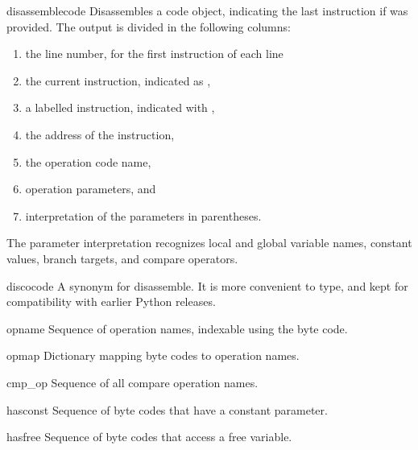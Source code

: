 \begin{funcdesc}{disassemble}{code}
Disassembles a code object, indicating the last instruction if 
was provided.  The output is divided in the following columns:

\begin{enumerate}
\item the line number, for the first instruction of each line
\item the current instruction, indicated as \samp{-->},
\item a labelled instruction, indicated with \samp{>>},
\item the address of the instruction,
\item the operation code name,
\item operation parameters, and
\item interpretation of the parameters in parentheses.
\end{enumerate}

The parameter interpretation recognizes local and global
variable names, constant values, branch targets, and compare
operators.
\end{funcdesc}

\begin{funcdesc}{disco}{code}
A synonym for disassemble.  It is more convenient to type, and kept
for compatibility with earlier Python releases.
\end{funcdesc}

\begin{datadesc}{opname}
Sequence of operation names, indexable using the byte code.
\end{datadesc}

\begin{datadesc}{opmap}
Dictionary mapping byte codes to operation names.
\end{datadesc}

\begin{datadesc}{cmp_op}
Sequence of all compare operation names.
\end{datadesc}

\begin{datadesc}{hasconst}
Sequence of byte codes that have a constant parameter.
\end{datadesc}

\begin{datadesc}{hasfree}
Sequence of byte codes that access a free variable.
\end{datadesc}

